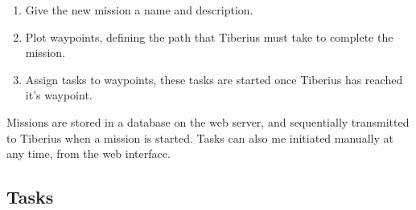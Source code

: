 \begin{enumerate}
\item Give the new mission a name and description.
\item Plot waypoints, defining the path that Tiberius must take to complete the mission.
\item Assign tasks to waypoints, these tasks are started once Tiberius has reached it's waypoint.
\end{enumerate}

Missions are stored in a database on the web server, and sequentially transmitted to Tiberius when a mission is started. Tasks can also me initiated manually at any time, from the web interface.

\subsection{Tasks}



